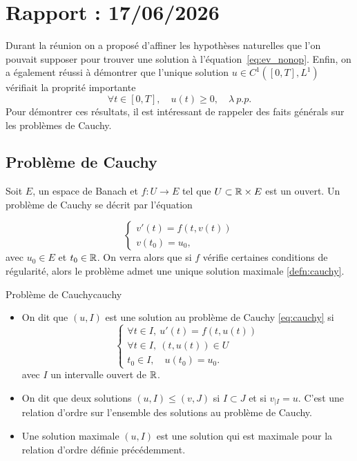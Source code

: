 \section{Rapport : 17/06/2026}

Durant la réunion on a proposé d'affiner les hypothèses naturelles que l'on pouvait supposer
pour trouver une solution à l'équation~\ref{eq:ev_nonop}. Enfin, on a également réussi à démontrer
que l'unique solution $u \in C^1([0,T], L^1)$ vérifiait la proprité importante
\[
	\forall t \in [0,T], \quad u(t) \ge 0,\quad \lambda\ p.p.
\]
Pour démontrer ces résultats, il est intéressant de rappeler des faits générals sur les problèmes de
Cauchy.

\subsection{Problème de Cauchy}

Soit $E$, un espace de Banach et $f : U \to E$ tel que $U \subset \mathbb{R} \times E$ est un ouvert. Un problème de Cauchy
se décrit par l'équation

\begin{equation}
	\begin{cases}
		v'(t) = f(t,v(t)) \\
		v(t_0) = u_0,
	\end{cases}
	\label{eq:cauchy}
\end{equation}
avec $u_0 \in E$ et $t_0 \in \mathbb{R}$. On verra alors que si $f$ vérifie certaines conditions de régularité,
alors le problème admet une unique solution maximale \ref{defn:cauchy}.

\begin{defn}{Problème de Cauchy}{cauchy}
	\begin{itemize}
		\item On dit que $(u,I)$ est une solution au problème de Cauchy \ref{eq:cauchy} si
		      \[
			      \begin{cases}
				      \forall t \in I, \ u'(t) = f(t,u(t)) \\
				      \forall t \in I, \ (t,u(t)) \in U    \\
				      t_0 \in I, \quad u(t_0) = u_0.
			      \end{cases}
		      \]
		      avec $I$ un intervalle ouvert de $\mathbb{R}$.
		\item On dit que deux solutions $(u, I) \le (v,J)$ si $I \subset J$ et si $v_{|I} = u$. C'est une relation d'ordre sur l'ensemble
		      des solutions au problème de Cauchy.
		\item Une solution maximale $(u,I)$ est une solution qui est maximale pour la relation d'ordre définie précédemment.
	\end{itemize}
\end{defn}

